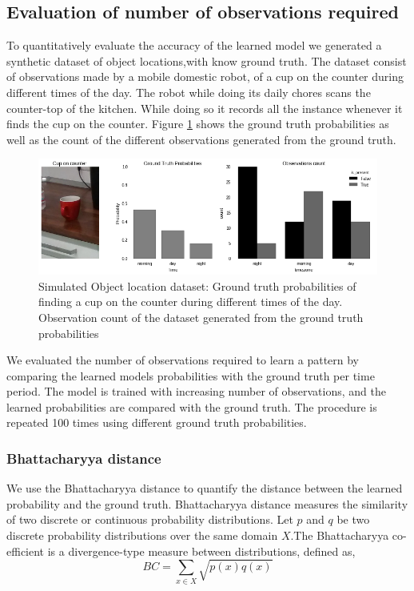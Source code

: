 \subsection{Evaluation of number of observations required}

To quantitatively evaluate the accuracy of the learned model we generated a synthetic dataset of object locations,with know ground truth. The dataset consist of observations made by a mobile domestic robot, of a cup on the counter during different times of the day. The robot while doing its daily chores scans the counter-top of the kitchen. While doing so it records all the instance whenever it finds the cup on the counter. Figure \ref{simulation} shows the ground truth probabilities as well as the count of the different observations generated from the ground truth.

\begin{figure}[htp]
\centering
\includegraphics[width=\textwidth]{images/object_simulation.png}
\caption[Simulated object location dataset]{Simulated Object location dataset: Ground truth probabilities of finding a cup on the counter during different times of the day. Observation count of the dataset generated from the ground truth probabilities}
\label{simulation}
\end{figure}

We evaluated the number of observations required to learn a pattern by comparing the learned models  probabilities with the ground truth per time period. The model is trained with increasing number of observations, and the learned probabilities are compared with the ground truth. The procedure is repeated 100 times using different ground truth probabilities.  

\subsubsection*{Bhattacharyya distance}
We use the Bhattacharyya distance \cite{bhattacharyya1946measure} to quantify the distance between the learned probability and the ground truth. Bhattacharyya distance measures the similarity of two discrete or continuous probability distributions. 
Let  $p$ and $q$ be two discrete probability distributions over the same domain $X$.The Bhattacharyya co-efficient \cite{bhattacharyya1946measure} is a divergence-type measure between distributions, defined as,
\begin{equation}
	BC = \sum_{x\in X}\sqrt{p(x)  q(x)} 
\end{equation}

